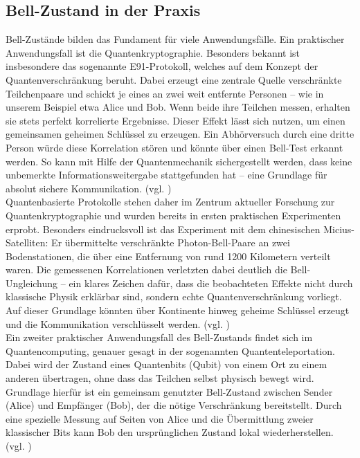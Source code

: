 \subsection{Bell-Zustand in der Praxis}

Bell-Zustände bilden das Fundament für viele Anwendungsfälle. Ein praktischer Anwendungsfall ist die Quantenkryptographie. Besonders bekannt ist insbesondere das sogenannte E91-Protokoll, welches auf dem Konzept der Quantenverschränkung beruht. Dabei erzeugt eine zentrale Quelle verschränkte Teilchenpaare und schickt je eines an zwei weit entfernte Personen – wie in unserem Beispiel etwa Alice und Bob. Wenn beide ihre Teilchen messen, erhalten sie stets perfekt korrelierte Ergebnisse. Dieser Effekt lässt sich nutzen, um einen gemeinsamen geheimen Schlüssel zu erzeugen. Ein Abhörversuch durch eine dritte Person würde diese Korrelation stören und könnte über einen Bell-Test erkannt werden. So kann mit Hilfe der Quantenmechanik sichergestellt werden, dass keine unbemerkte Informationsweitergabe stattgefunden hat – eine Grundlage für absolut sichere Kommunikation. (vgl. \cite[S. 3841 f.]{state-of-the-art-survey})
\\


Quantenbasierte Protokolle stehen daher im Zentrum aktueller Forschung zur Quantenkryptographie und wurden bereits in ersten praktischen Experimenten erprobt. Besonders eindrucksvoll ist das Experiment mit dem chinesischen Micius-Satelliten: Er übermittelte verschränkte Photon-Bell-Paare an zwei Bodenstationen, die über eine Entfernung von rund 1200 Kilometern verteilt waren. Die gemessenen Korrelationen verletzten dabei deutlich die Bell-Ungleichung – ein klares Zeichen dafür, dass die beobachteten Effekte nicht durch klassische Physik erklärbar sind, sondern echte Quantenverschränkung vorliegt. Auf dieser Grundlage könnten über Kontinente hinweg geheime Schlüssel erzeugt und die Kommunikation verschlüsselt werden. (vgl. \cite{Entanglement Distribution})
\\


Ein zweiter praktischer Anwendungsfall des Bell-Zustands findet sich im Quantencomputing, genauer gesagt in der sogenannten Quantenteleportation. Dabei wird der Zustand eines Quantenbits (Qubit) von einem Ort zu einem anderen übertragen, ohne dass das Teilchen selbst physisch bewegt wird. Grundlage hierfür ist ein gemeinsam genutzter Bell-Zustand zwischen Sender (Alice) und Empfänger (Bob), der die nötige Verschränkung bereitstellt. Durch eine spezielle Messung auf Seiten von Alice und die Übermittlung zweier klassischer Bits kann Bob den ursprünglichen Zustand lokal wiederherstellen. (vgl. \cite{Teleporting})
\\


